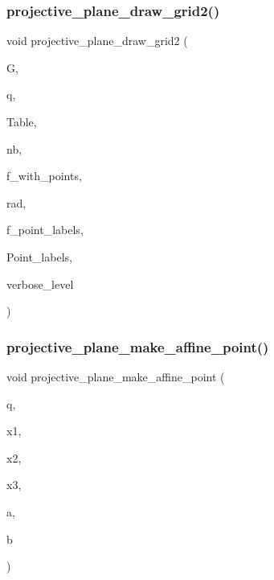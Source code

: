 \subsubsection{\texorpdfstring{projective\+\_\+plane\+\_\+draw\+\_\+grid2()}{projective\_plane\_draw\_grid2()}}
{\footnotesize\ttfamily void projective\+\_\+plane\+\_\+draw\+\_\+grid2 (\begin{DoxyParamCaption}\item[{\mbox{\hyperlink{classmp__graphics}{mp\+\_\+graphics}} \&}]{G,  }\item[{\mbox{\hyperlink{galois_8h_a09fddde158a3a20bd2dcadb609de11dc}{I\+NT}}}]{q,  }\item[{\mbox{\hyperlink{galois_8h_a09fddde158a3a20bd2dcadb609de11dc}{I\+NT}} $\ast$}]{Table,  }\item[{\mbox{\hyperlink{galois_8h_a09fddde158a3a20bd2dcadb609de11dc}{I\+NT}}}]{nb,  }\item[{\mbox{\hyperlink{galois_8h_a09fddde158a3a20bd2dcadb609de11dc}{I\+NT}}}]{f\+\_\+with\+\_\+points,  }\item[{\mbox{\hyperlink{galois_8h_a09fddde158a3a20bd2dcadb609de11dc}{I\+NT}}}]{rad,  }\item[{\mbox{\hyperlink{galois_8h_a09fddde158a3a20bd2dcadb609de11dc}{I\+NT}}}]{f\+\_\+point\+\_\+labels,  }\item[{\mbox{\hyperlink{galois_8h_ab6cc7b4aeb6ea31aba2b3fbfc83ff5e6}{B\+Y\+TE}} $\ast$$\ast$}]{Point\+\_\+labels,  }\item[{\mbox{\hyperlink{galois_8h_a09fddde158a3a20bd2dcadb609de11dc}{I\+NT}}}]{verbose\+\_\+level }\end{DoxyParamCaption})}

\mbox{\label{plot_8_c_a54645ba8a7d4376663092cd4959cfb2f}} 
\subsubsection{\texorpdfstring{projective\+\_\+plane\+\_\+make\+\_\+affine\+\_\+point()}{projective\_plane\_make\_affine\_point()}}
{\footnotesize\ttfamily void projective\+\_\+plane\+\_\+make\+\_\+affine\+\_\+point (\begin{DoxyParamCaption}\item[{\mbox{\hyperlink{galois_8h_a09fddde158a3a20bd2dcadb609de11dc}{I\+NT}}}]{q,  }\item[{\mbox{\hyperlink{galois_8h_a09fddde158a3a20bd2dcadb609de11dc}{I\+NT}}}]{x1,  }\item[{\mbox{\hyperlink{galois_8h_a09fddde158a3a20bd2dcadb609de11dc}{I\+NT}}}]{x2,  }\item[{\mbox{\hyperlink{galois_8h_a09fddde158a3a20bd2dcadb609de11dc}{I\+NT}}}]{x3,  }\item[{double \&}]{a,  }\item[{double \&}]{b }\end{DoxyParamCaption})}

